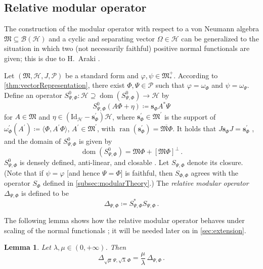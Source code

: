 \documentclass[a4paper, twoside, 11pt, reqno]{amsart}
\theoremstyle{definition}
\theoremstyle{plain}
\newtheorem{lemma}[definition]{Lemma}
\renewcommand{\subset}{\subseteq}
\renewcommand{\supset}{\supseteq}
\renewcommand{\Delta}{\varDelta}
\renewcommand{\Phi}{\varPhi}
\renewcommand{\Psi}{\varPsi}
\renewcommand{\Omega}{\varOmega}
\newcommand{\MH}{\mathcal{H}}
\newcommand{\MFM}{\mathfrak{M}}
\newcommand{\BO}{\mathscr{B}}
\newcommand{\comm}[1]{#1^{\prime}}
\newcommand{\NF}[1]{#1_{\ast}^{+}}
\newcommand{\NPC}{\mathcal{P}}
\newcommand{\id}{\mathrm{Id}}
\newcommand{\1}{\mathbf{1}}
\newcommand{\ssupp}{\mathbf{s}}
\DeclareMathOperator{\dom}{dom}
\DeclareMathOperator{\ran}{ran}
\newcommand{\braket}[2][]{#1\langle{#2}#1\rangle}
\newcommand{\ce}{\coloneqq}
\newcommand{\oln}[1]{\overline{#1}}
\begin{document}
\subsection{Relative modular operator}

The construction of the modular operator with respect to a von Neumann algebra $\MFM \subset \BO(\MH)$ and a cyclic and separating vector $\Omega \in \MH$ can be generalized to the situation in which two (not necessarily faithful) positive normal functionals are given; this is due to H.~Araki \cite{Araki1977}.

Let $(\MFM, \MH, J, \NPC)$ be a standard form and $\varphi, \psi \in \NF{\MFM}$. According to \cref{thm:vectorRepresentation}, there exist $\Phi, \Psi \in \NPC$ such that $\varphi = \omega_\Phi$ and $\psi = \omega_\Psi$. Define an operator $S_{\Psi, \Phi}^0 : \MH \supset \dom(S_{\Psi, \Phi}^0) \to \MH$ by
\begin{equation*}
    S_{\Psi, \Phi}^0(A \Phi + \eta) \ce \ssupp_\Phi A^\ast \Psi
\end{equation*}
for $A \in \MFM$ and $\eta \in (\id_\MH - \ssupp_\Phi^\prime) \MH$, where $\ssupp_\Phi^\prime \in \comm{\MFM}$ is the support of $\omega_\Phi^\prime (A^\prime) \ce \braket{\Phi, A^\prime \Phi}$, $A^\prime \in \comm{\MFM}$, with $\ran (\ssupp_\Phi^\prime) = \oln{\MFM \Phi}$. It holds that $J \ssupp_\Phi J = \ssupp_\Phi^\prime$ \cite[p. 163]{Hiai2021}, and the domain of $S_{\Psi, \Phi}^0$ is given by
\begin{equation*}
    \dom(S_{\Psi, \Phi}^0) = \MFM \Phi + [\MFM \Phi]^\perp \, .
\end{equation*}
$S_{\Psi, \Phi}^0$ is densely defined, anti-linear, and closable \cite[Lem. 10.2]{Hiai2021}. Let $S_{\Psi, \Phi}$ denote its closure. (Note that if $\psi = \varphi$ [and hence $\Psi = \Phi$] is faithful, then $S_{\Phi, \Phi}$ agrees with the operator $S_\Phi$ defined in \cref{subsec:modularTheory}.) The \emph{relative modular operator} $\Delta_{\Psi, \Phi}$ is defined to be
\begin{equation*}
    \Delta_{\Psi, \Phi} \ce S_{\Psi, \Phi}^\ast S_{\Psi, \Phi} \, .
\end{equation*}

The following lemma shows how the relative modular operator behaves under scaling of the normal functionals \cite[p. 179]{Araki1977}; it will be needed later on in \cref{sec:extension}.

\begin{lemma}\label{lem:relModOpScaling}
    Let $\lambda, \mu \in (0, + \infty)$. Then
    \begin{equation*}
        \Delta_{\sqrt{\mu} \, \Psi, \sqrt{\lambda} \, \Phi} = \frac{\mu}{\lambda} \, \Delta_{\Psi, \Phi} \, .
    \end{equation*}
\end{lemma}
\end{document}
